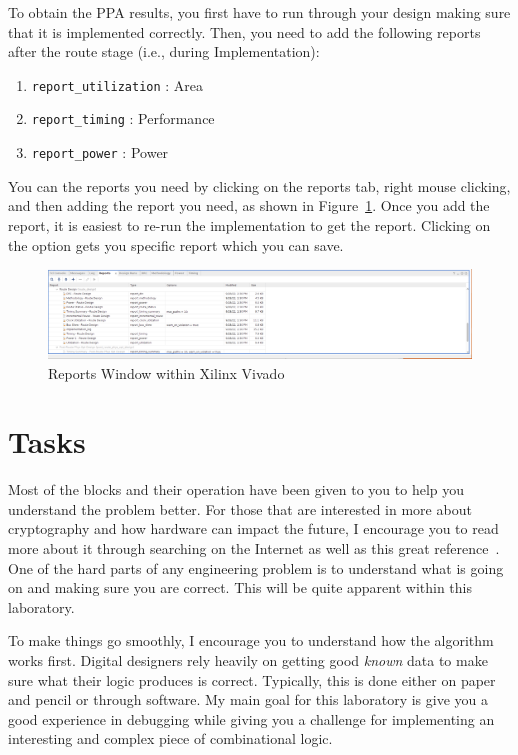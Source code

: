 \documentclass{article}
\begin{document}
To obtain the PPA results, you first have to run through your design
making sure that it is implemented correctly.  Then, you need to add
the following reports after the route stage (i.e., during
Implementation):
\begin{enumerate}
\item \verb!report_utilization! : Area
\item \verb!report_timing! : Performance
\item \verb!report_power! : Power
\end{enumerate}
You can the reports you need by clicking on the reports tab, right
mouse clicking, and then adding the report you need, as shown in
Figure~\ref{reports1.png}.  Once you add the report, it is easiest to
re-run the implementation to get the report.  Clicking on the option
gets you specific report which you can save.
\begin{figure} [b!]
  \centering
  \includegraphics[scale=0.3, width=\columnwidth]{analysis.png}
  \caption{Reports Window within Xilinx Vivado}
  \label{reports1.png}
\end{figure}

  
\section{Tasks}

Most of the blocks and their operation
have been given to you to help you understand the
problem better.
For those that are interested in more about cryptography and how
hardware can impact the future, I encourage you to read more about it
through searching on the Internet as well as this great
reference~\cite{10.5555/1721909}.
One of the hard parts of any engineering problem is
to understand what is going on and making sure you are correct.  This
will be quite apparent within this laboratory.

To make things go
smoothly, I encourage you to understand how the algorithm works first.
Digital designers rely heavily on getting good \textit{known} data to make
sure what their logic produces is correct.  Typically, this is done
either on paper and
pencil or through software.  My main goal for this laboratory is give
you a good experience in debugging while giving you a challenge for
implementing an interesting and complex piece of combinational logic.
\end{document}
